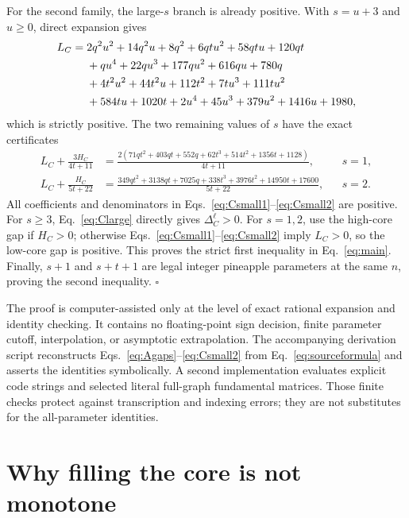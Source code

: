 \documentclass[11pt]{article}
\begin{document}
For the second family, the large-$s$ branch is already positive.  With
$s=u+3$ and $u\geq0$, direct expansion gives
\begin{align}
L_C={}&2q^2u^2+14q^2u+8q^2+6qtu^2+58qtu+120qt\notag\\
&+qu^4+22qu^3+177qu^2+616qu+780q\notag\\
&+4t^2u^2+44t^2u+112t^2+7tu^3+111tu^2\notag\\
&+584tu+1020t+2u^4+45u^3+379u^2+1416u+1980,
\label{eq:Clarge}
\end{align}
which is strictly positive.  The two remaining values of $s$ have the exact
certificates
\begin{align}
L_C+\frac{3H_C}{4t+11}
&=\frac{2(71qt^2+403qt+552q+62t^3+514t^2+1356t+1128)}{4t+11},
&&s=1,\label{eq:Csmall1}\\
L_C+\frac{H_C}{5t+22}
&=\frac{349qt^2+3138qt+7025q+338t^3+3976t^2+14950t+17600}{5t+22},
&&s=2.\label{eq:Csmall2}
\end{align}
All coefficients and denominators in Eqs.~\eqref{eq:Csmall1}--\eqref{eq:Csmall2}
are positive.  For $s\geq3$, Eq.~\eqref{eq:Clarge} directly gives
$\Delta_C^\ell>0$.  For $s=1,2$, use the high-core gap if $H_C>0$; otherwise
Eqs.~\eqref{eq:Csmall1}--\eqref{eq:Csmall2} imply $L_C>0$, so the low-core
gap is positive.  This proves the strict first inequality in Eq.~\eqref{eq:main}.
Finally, $s+1$ and $s+t+1$ are legal integer pineapple parameters at the same
$n$, proving the second inequality.  \hfill$\square$

The proof is computer-assisted only at the level of exact rational expansion
and identity checking.  It contains no floating-point sign decision, finite
parameter cutoff, interpolation, or asymptotic extrapolation.  The accompanying
derivation script reconstructs Eqs.~\eqref{eq:Agaps}--\eqref{eq:Csmall2} from
Eq.~\eqref{eq:sourceformula} and asserts the identities symbolically.  A second
implementation evaluates explicit code strings and selected literal full-graph
fundamental matrices.  Those finite checks protect against transcription and
indexing errors; they are not substitutes for the all-parameter identities.

\section{Why filling the core is not monotone}
\label{sec:nonmonotone}
\end{document}
